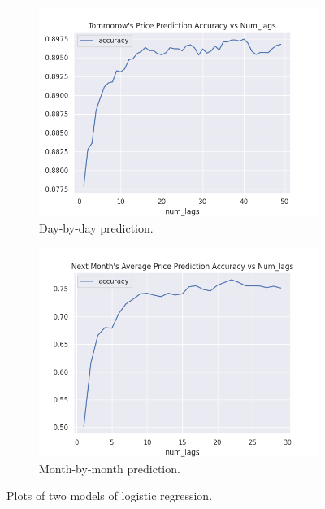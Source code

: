 \begin{figure}[h!]
	\centering
	\begin{subfigure}[b]{0.4\linewidth}
		\includegraphics[width=\linewidth]{pictures/logistic-regression-v1.png}
		\caption{Day-by-day prediction.}
		\label{fig:logv1}
	\end{subfigure}
	\begin{subfigure}[b]{0.4\linewidth}
		\includegraphics[width=\linewidth]{pictures/logistic-regression-v2.png}
		\caption{Month-by-month prediction.}
		\label{fig:logv2}
	\end{subfigure}
	\caption{Plots of two models of logistic regression.}
	\label{fig:logistic-regression}
\end{figure}












